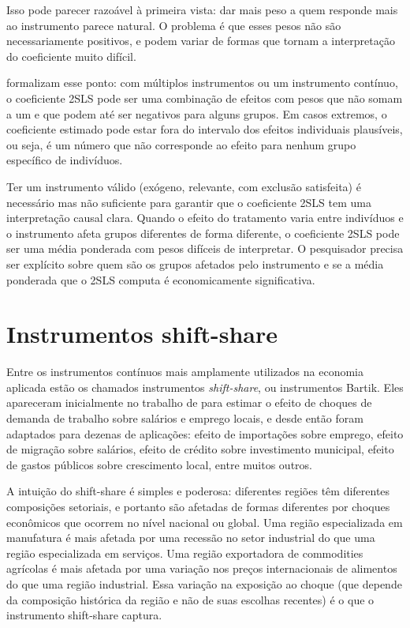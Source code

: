 Isso pode parecer razoável à primeira vista: dar mais peso a quem responde mais ao instrumento parece natural. O problema é que esses pesos não são necessariamente positivos, e podem variar de formas que tornam a interpretação do coeficiente muito difícil.

\citet{MogstadTorgovitskyWalters2021} formalizam esse ponto: com múltiplos instrumentos ou um instrumento contínuo, o coeficiente 2SLS pode ser uma combinação de efeitos com pesos que não somam a um e que podem até ser negativos para alguns grupos. Em casos extremos, o coeficiente estimado pode estar fora do intervalo dos efeitos individuais plausíveis, ou seja, é um número que não corresponde ao efeito para nenhum grupo específico de indivíduos.

\begin{atencaobox}
Ter um instrumento válido (exógeno, relevante, com exclusão satisfeita) é necessário mas não suficiente para garantir que o coeficiente 2SLS tem uma interpretação causal clara. Quando o efeito do tratamento varia entre indivíduos e o instrumento afeta grupos diferentes de forma diferente, o coeficiente 2SLS pode ser uma média ponderada com pesos difíceis de interpretar. O pesquisador precisa ser explícito sobre quem são os grupos afetados pelo instrumento e se a média ponderada que o 2SLS computa é economicamente significativa.
\end{atencaobox}

\section{Instrumentos shift-share}
\label{sec:shiftshare}

Entre os instrumentos contínuos mais amplamente utilizados na economia aplicada estão os chamados instrumentos \textit{shift-share}, ou instrumentos Bartik. Eles apareceram inicialmente no trabalho de \citet{Bartik1991} para estimar o efeito de choques de demanda de trabalho sobre salários e emprego locais, e desde então foram adaptados para dezenas de aplicações: efeito de importações sobre emprego, efeito de migração sobre salários, efeito de crédito sobre investimento municipal, efeito de gastos públicos sobre crescimento local, entre muitos outros.

A intuição do shift-share é simples e poderosa: diferentes regiões têm diferentes composições setoriais, e portanto são afetadas de formas diferentes por choques econômicos que ocorrem no nível nacional ou global. Uma região especializada em manufatura é mais afetada por uma recessão no setor industrial do que uma região especializada em serviços. Uma região exportadora de commodities agrícolas é mais afetada por uma variação nos preços internacionais de alimentos do que uma região industrial. Essa variação na exposição ao choque (que depende da composição histórica da região e não de suas escolhas recentes) é o que o instrumento shift-share captura.


